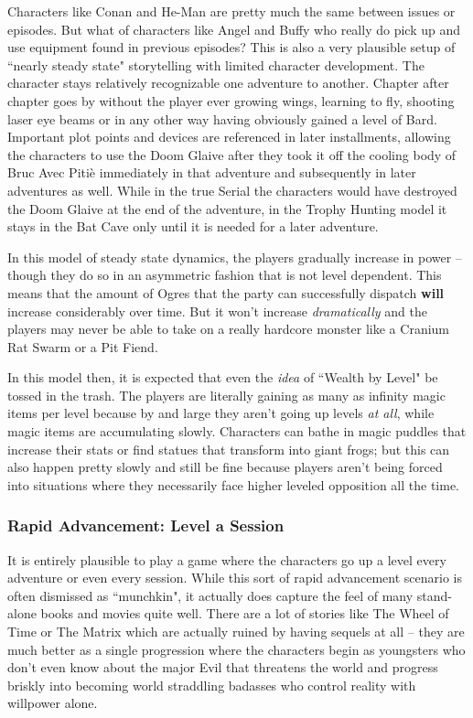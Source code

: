 Characters like Conan and He-Man are pretty much the same between issues or episodes. But what of characters like Angel and Buffy who really do pick up and use equipment found in previous episodes? This is also a very plausible setup of ``nearly steady state" storytelling with limited character development. The character stays relatively recognizable one adventure to another. Chapter after chapter goes by without the player ever growing wings, learning to fly, shooting laser eye beams or in any other way having obviously gained a level of Bard. Important plot points and devices are referenced in later installments, allowing the characters to use the Doom Glaive after they took it off the cooling body of Bruc Avec Piti\`{e} immediately in that adventure and subsequently in later adventures as well. While in the true Serial the characters would have destroyed the Doom Glaive at the end of the adventure, in the Trophy Hunting model it stays in the Bat Cave only until it is needed for a later adventure.

In this model of steady state dynamics, the players gradually increase in power -- though they do so in an asymmetric fashion that is not level dependent. This means that the amount of Ogres that the party can successfully dispatch \textbf{will} increase considerably over time. But it won't increase \textit{dramatically} and the players may never be able to take on a really hardcore monster like a Cranium Rat Swarm or a Pit Fiend.

In this model then, it is expected that even the \textit{idea} of ``Wealth by Level" be tossed in the trash. The players are literally gaining as many as infinity magic items per level because by and large they aren't going up levels \textit{at all}, while magic items are accumulating slowly. Characters can bathe in magic puddles that increase their stats or find statues that transform into giant frogs; but this can also happen pretty slowly and still be fine because players aren't being forced into situations where they necessarily face higher leveled opposition all the time.

\subsubsection{Rapid Advancement: Level a Session}
\vspace*{-8pt}

It is entirely plausible to play a game where the characters go up a level every adventure or even every session. While this sort of rapid advancement scenario is often dismissed as ``munchkin", it actually does capture the feel of many stand-alone books and movies quite well. There are a lot of stories like The Wheel of Time or The Matrix which are actually ruined by having sequels at all -- they are much better as a single progression where the characters begin as youngsters who don't even know about the major Evil that threatens the world and progress briskly into becoming world straddling badasses who control reality with willpower alone.

